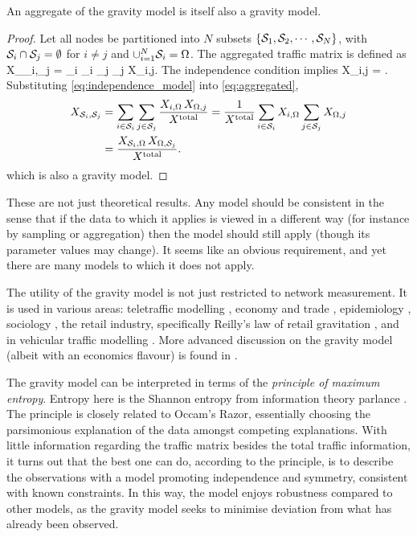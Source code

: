 \begin{thm}[Aggregation]
An aggregate of the gravity model is itself also a gravity model. 
\label{thm:aggregation}
\end{thm}
\begin{proof}
  Let all nodes be partitioned into $N$ subsets $\{\mathcal{S}_1,\mathcal{S}_2,
  \cdots,\mathcal{S}_N\}$, with $\mathcal{S}_i \cap \mathcal{S}_j = \emptyset$ for $i \ne j$
  and $\cup_{i=1}^N \mathcal{S}_i = \Omega$. The aggregated traffic matrix is
  defined as \be X_{\cS_i,\cS_j} = \sum_{i \in \cS_i} \sum_{j \in
    \cS_j} X_{i,j}.
\label{eq:aggregated}
\ee
The independence condition implies 
\be
X_{i,j} = .
\label{eq:independence_model}
\ee
Substituting \autoref{eq:independence_model} into \autoref{eq:aggregated}, 
\begin{align*}
X_{\mathcal{S}_i,\mathcal{S}_j} &= \sum_{i \in \mathcal{S}_i} \sum_{j \in \mathcal{S}_j} \frac{X_{i,\Omega} \,X_{\Omega,j}}{X^{\text{total}}}
= \frac{1}{X^{\text{total}}} \sum_{i \in \mathcal{S}_i} X_{i,\Omega} \sum_{j \in \mathcal{S}_j} X_{\Omega,j}\\
&=  \frac{X_{\mathcal{S}_i,\Omega} \, X_{\Omega,\mathcal{S}_j}}{X^{\text{total}}}.
\end{align*}
which is also a gravity model.
\end{proof}

These are not just theoretical results. Any model should be consistent
in the sense that if the data to which it applies is viewed in a
different way (for instance by sampling or aggregation) then the model
should still apply (though its parameter values may change). It seems
like an obvious requirement, and yet there are many models to which it
does not apply. 

The utility of the gravity model is not just restricted to network
measurement. It is used in various areas: teletraffic modelling
\cite{Kowalski95TeleModel,Lam97Teletraffic}, economy and trade
\cite{Pyhnen63Trade,Tinbergen62Econ}, epidemiology
\cite{Ferrari06Pollinator,Murray77Measles,Xia04Measles}, sociology
\cite{Stewart48Socio}, the retail industry, specifically Reilly's law
of retail gravitation
\cite{Converse49RetGravNew,Jung59RetailGravTrue,Reynolds53RetailGrav},
and in vehicular traffic modelling \cite{Erlander90GravTransport}. More
advanced discussion on the gravity model (albeit with an economics
flavour) is found in \cite{Sen95Gravity}.

The gravity model can be interpreted in terms of the \emph{principle
of maximum entropy}. Entropy here is the Shannon entropy from
information theory parlance \cite{Cover06InfoTheory}. The principle is
closely related to Occam's Razor, essentially choosing the
parsimonious explanation of the data amongst competing
explanations. With little information regarding the traffic matrix
besides the total traffic information, it turns out that the best one
can do, according to the principle, is to describe the observations
with a model promoting independence and symmetry, consistent with
known constraints.  In this way, the model enjoys robustness compared
to other models, as the gravity model seeks to minimise deviation from
what has already been observed.

